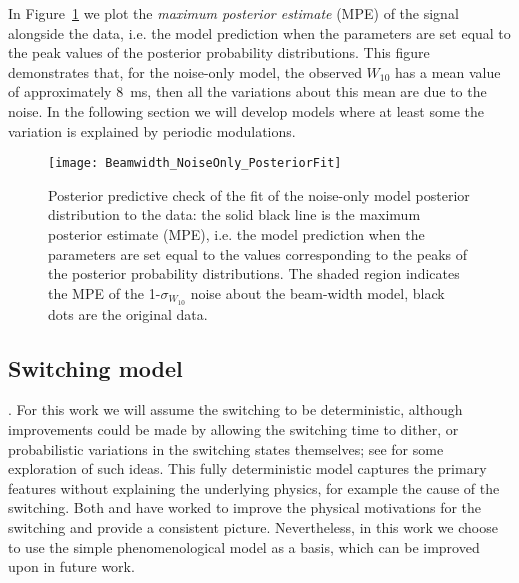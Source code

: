 \documentclass[../full_thesis/full_thesis.tex]{subfiles}
\begin{document}
In Figure~\ref{fig: noise-only beam-width posterior fit} we plot the
\emph{maximum posterior estimate} (MPE) of the signal alongside the data, i.e.
the model prediction when the parameters are set equal to the peak values of
the posterior probability distributions.  This figure demonstrates that, for
the noise-only model, the observed $W_{10}$ has a mean value of approximately
$8$~ms, then all the variations about this mean are due to the noise. In the
following section we will develop models where at least some the variation is
explained by periodic modulations.
\begin{figure}
\centering
\texttt{[image: Beamwidth\_NoiseOnly\_PosteriorFit]}
\caption{Posterior predictive check of the fit of the noise-only model
posterior distribution to the data: the solid black line is the maximum
posterior estimate (MPE), i.e. the model prediction when the parameters are set
equal to the values corresponding to the peaks of the posterior probability
distributions.   The shaded region indicates the MPE of the 1-$\sigma_{W_{10}}$
noise about the beam-width model, black dots are the original data.}
\label{fig: noise-only beam-width posterior fit}
\end{figure}

\subsection{Switching model}
\label{sec: switching}

. For this work we will assume the switching to be deterministic,
although improvements could be made by allowing the switching time to dither,
or probabilistic variations in the switching states themselves; see
\citet{Lyne2010} for some exploration of such ideas. This fully deterministic
model captures the primary features without explaining the underlying physics,
for example the cause of the switching.  Both \citet{Jones2012} and
\citet{Cordes2013} have worked to improve the physical motivations for the
switching and provide a consistent picture. Nevertheless, in this work we
choose to use the simple phenomenological model as a basis, which can be
improved upon in future work.
\end{document}
